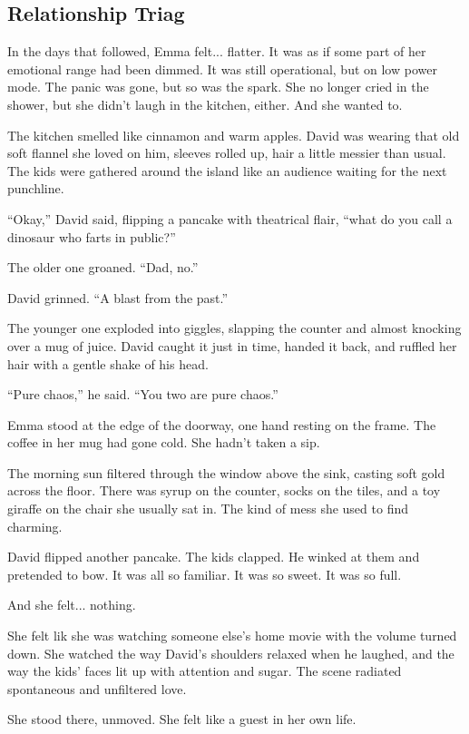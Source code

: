 
\subsection{Relationship Triag}

In the days that followed, Emma felt... flatter. It was as if some part of her emotional 
range had been dimmed. It was still operational, but on low power mode. The panic was gone, but 
so was the 
spark. She no longer cried in the shower, but she didn’t laugh in the kitchen, either. And she 
wanted to.

The kitchen smelled like cinnamon and warm apples. David was wearing that old soft flannel she loved on 
him, sleeves rolled up, hair a little messier than usual. The kids were gathered around the island like 
an audience waiting for the next punchline.

``Okay,'' David said, flipping a pancake with theatrical flair, ``what do you call a dinosaur who farts 
in public?''

The older one groaned. ``Dad, no.''

David grinned. ``A blast from the past.''

The younger one exploded into giggles, slapping the counter and almost knocking over a mug of juice.
David caught it just in time, handed it back, and ruffled her hair with a gentle shake of his head.

``Pure chaos,'' he said. ``You two are pure chaos.''

Emma stood at the edge of the doorway, one hand resting on the frame. The coffee in her mug had gone cold. 
She hadn’t taken a sip.

The morning sun filtered through the window above the sink, casting soft gold across the floor. 
There was 
syrup on the counter, socks on the tiles, and a toy giraffe on the chair she usually sat in. The 
kind of mess 
she used to find charming. 

David flipped another pancake. The kids clapped. He winked at them and pretended to bow. It was 
all so familiar. 
It was so sweet. It was so full.

And she felt... nothing.

She felt lik she was watching someone else’s home movie with the volume turned down. She watched 
the way David’s 
shoulders relaxed when he laughed, and the way the kids’ faces lit up with attention and sugar. 
The scene 
radiated spontaneous and unfiltered love.

She stood there, unmoved. She felt like a guest in her own life.

